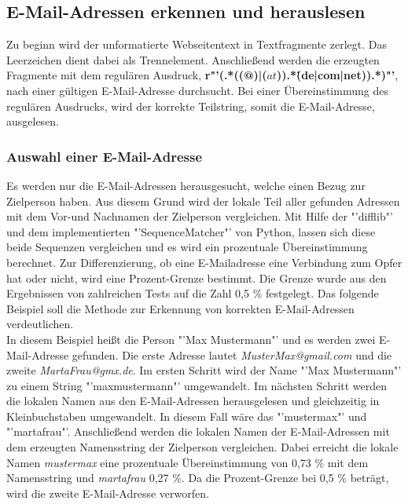 	\subsection{E-Mail-Adressen erkennen und herauslesen}
		Zu beginn wird der unformatierte Webseitentext in Textfragmente zerlegt. Das Leerzeichen dient dabei als Trennelement. Anschließend werden die erzeugten Fragmente mit dem regulären Ausdruck, \textbf{r"'(.*((@)|(\(at\))).*\.(de|com|net)).*)"'}, nach einer gültigen E-Mail-Adresse durchsucht. Bei einer Übereinstimmung des regulären Ausdrucks, wird der korrekte Teilstring, somit die E-Mail-Adresse, ausgelesen. 
		\subsubsection{Auswahl einer E-Mail-Adresse}
		Es werden nur die E-Mail-Adressen herausgesucht, welche einen Bezug zur Zielperson haben. Aus diesem Grund wird der lokale Teil aller gefunden Adressen mit dem Vor-und Nachnamen der Zielperson vergleichen. Mit Hilfe der "'difflib"' und dem implementierten "'SequenceMatcher"' von Python, lassen sich diese beide Sequenzen vergleichen und es wird ein prozentuale Übereinstimmung berechnet. Zur Differenzierung, ob eine E-Mailadresse eine Verbindung zum Opfer hat oder nicht, wird eine Prozent-Grenze bestimmt. Die Grenze wurde aus den Ergebnissen von zahlreichen Tests auf die Zahl 0,5 \% festgelegt. Das folgende Beispiel soll die Methode zur Erkennung von korrekten E-Mail-Adressen verdeutlichen.\\
		In diesem Beispiel heißt die Person "'Max Mustermann"' und es werden zwei E-Mail-Adresse gefunden. Die erste Adresse lautet \textit{MusterMax@gmail.com} und die zweite \textit{MartaFrau@gmx.de}. Im ersten Schritt wird der Name "'Max Mustermann"' zu einem String "'maxmustermann"' umgewandelt. Im nächsten Schritt werden die lokalen Namen aus den E-Mail-Adressen herausgelesen und gleichzeitig in Kleinbuchstaben umgewandelt. In diesem Fall wäre das "'mustermax"' und "'martafrau"'. Anschließend werden die lokalen Namen der E-Mail-Adressen mit dem erzeugten Namensstring der Zielperson vergleichen. Dabei erreicht die lokale Namen \textit{mustermax} eine prozentuale Übereinstimmung von 0,73 \% mit dem Namensstring und \textit{martafrau} 0,27 \%. Da die Prozent-Grenze bei 0,5 \% beträgt, wird die zweite E-Mail-Adresse verworfen.
	
